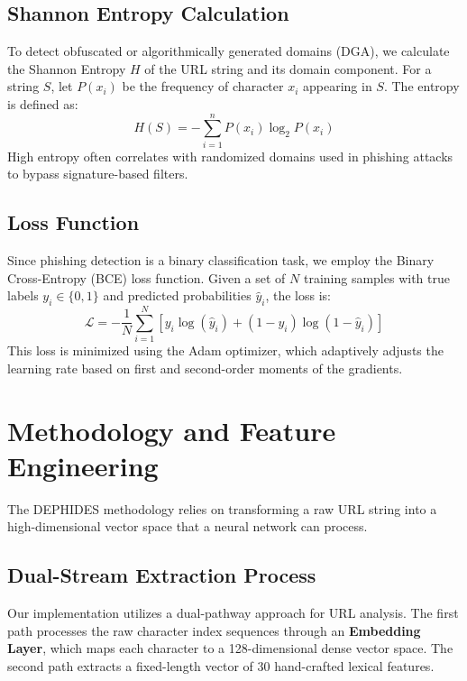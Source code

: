 \documentclass[journal,twocolumn]{IEEEtran}
\begin{document}
\subsection{Shannon Entropy Calculation}
To detect obfuscated or algorithmically generated domains (DGA), we calculate the Shannon Entropy $H$ of the URL string and its domain component. For a string $S$, let $P(x_i)$ be the frequency of character $x_i$ appearing in $S$. The entropy is defined as:
\begin{equation}
    H(S) = - \sum_{i=1}^{n} P(x_i) \log_2 P(x_i)
\end{equation}
High entropy often correlates with randomized domains used in phishing attacks to bypass signature-based filters.

\subsection{Loss Function}
Since phishing detection is a binary classification task, we employ the Binary Cross-Entropy (BCE) loss function. Given a set of $N$ training samples with true labels $y_i \in \{0, 1\}$ and predicted probabilities $\hat{y}_i$, the loss is:
\begin{equation}
    \mathcal{L} = - \frac{1}{N} \sum_{i=1}^{N} \left[ y_i \log(\hat{y}_i) + (1-y_i) \log(1-\hat{y}_i) \right]
\end{equation}
This loss is minimized using the Adam optimizer, which adaptively adjusts the learning rate based on first and second-order moments of the gradients.

\section{Methodology and Feature Engineering}
The DEPHIDES methodology relies on transforming a raw URL string into a high-dimensional vector space that a neural network can process.

\subsection{Dual-Stream Extraction Process}
Our implementation utilizes a dual-pathway approach for URL analysis. The first path processes the raw character index sequences through an \textbf{Embedding Layer}, which maps each character to a 128-dimensional dense vector space. The second path extracts a fixed-length vector of 30 hand-crafted lexical features.
\end{document}
